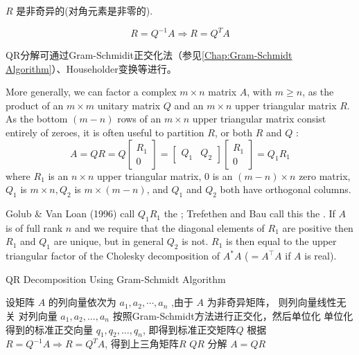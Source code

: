 \begin{corollary}
     $ R $ 是非奇异的(对角元素是非零的).
\end{corollary}

\begin{corollary}
    \begin{equation} R=Q^{-1} A \Rightarrow R=Q^{T} A \end{equation}
\end{corollary}

QR分解可通过Gram-Schmidit正交化法（参见\ref{Chap:Gram-Schmidt Algorithm}）、Householder变换等进行。

More generally, we can factor a complex $ m \times n $ matrix $ A $, with $ m \geq n $, as the product of an $ m \times m $ unitary matrix $ Q $ and an $ m \times n $ upper triangular matrix $ R $. As the bottom $ (m-n) $ rows of an $ m \times n $ upper triangular matrix consist entirely of zeroes, it is often useful to partition $ R $, or both $ R $ and $ Q $ :
\begin{equation}
A=Q R=Q\left[\begin{array}{c}
R_{1} \\
0
\end{array}\right]=\left[\begin{array}{ll}
Q_{1} & Q_{2}
\end{array}\right]\left[\begin{array}{c}
R_{1} \\
0
\end{array}\right]=Q_{1} R_{1}
\end{equation}
where $ R_{1} $ is an $ n \times n $ upper triangular matrix, 0 is an $ (m-n) \times n $ zero matrix, $ Q_{1} $ is $ m \times n, Q_{2} $ is $ m \times(m-n) $, and $ Q_{1} $ and $ Q_{2} $ both have orthogonal columns.

Golub \& Van Loan (1996) call $ Q_{1} R_{1} $ the ; Trefethen and Bau call this the .   If $ A $ is of full rank $ n $ and we require that the diagonal elements of $ R_{1} $ are positive then $ R_{1} $ and $ Q_{1} $ are unique, but in general $ Q_{2} $ is not. $ R_{1} $ is then equal to the upper triangular factor of the Cholesky decomposition of $ A^{*} A$ ($=A^{\top} A $ if $ A $ is real).


\begin{algorithm}[htbp]
    \caption{QR Decomposition Using Gram-Schmidt Algorithm}
    
    设矩阵 $ A $ 的列向量依次为 $ a_{1}, a_{2}, \cdots, a_{n} $ ,由于 $ A $ 为非奇异矩阵， 则列向量线性无关\;
    对列向量 $ a_{1}, a_{2}, \ldots, a_{n} $ 按照Gram-Schmidt方法进行正交化，然后单位化\;
    单位化得到的标准正交向量 $ q_{1}, q_{2}, \ldots, q_{n} $, 即得到标准正交矩阵$Q$\;
    根据 $ R=Q^{-1} A \Rightarrow R=Q^{T} A $, 得到上三角矩阵$R$\;
    $ Q R $ 分解 $ A=Q R $\;
\end{algorithm}

